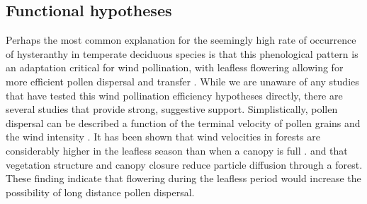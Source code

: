 \documentclass{article}
\begin{document}
\subsection*{Functional hypotheses}
\indent Perhaps the most common explanation for the seemingly high rate of occurrence of hysteranthy in temperate deciduous species is that this phenological pattern is an adaptation critical for wind pollination, with leafless flowering allowing for more efficient pollen dispersal and transfer \citep{Whitehead1969,Rathcke1985, Spurr1980}. While we are unaware of any studies that have tested this wind pollination efficiency hypotheses directly, there are several studies that provide strong, suggestive support. Simplistically, pollen dispersal can be described a function of the terminal velocity of pollen grains and the wind intensity \citep*{Niklas1985,Whitehead1969}. It has been shown that wind velocities in forests are considerably higher in the leafless season than when a canopy is full \citep*{Brown1969,Whitehead1969}. and that vegetation structure and canopy closure reduce particle diffusion through a forest\citep{Brown1969}. These finding indicate that flowering during the leafless period would increase the possibility of long distance pollen dispersal.\\
\end{document}
